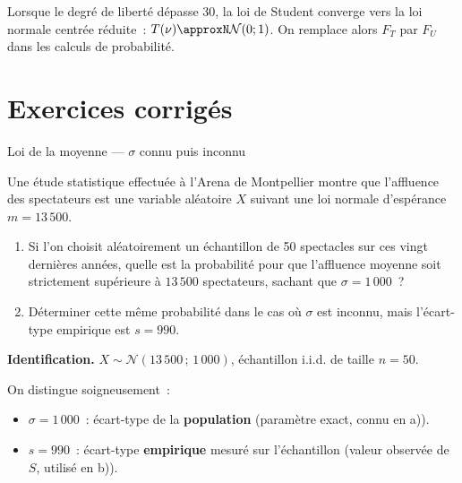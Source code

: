 \documentclass[11pt,a4paper]{article}
\newcommand{\N}{\mathcal{N}}
\newcommand{\corrsep}{\vspace{4pt}{\color{rulecol}\hrule height 0.6pt}\vspace{6pt}}
\begin{document}
\begin{methbox}
Lorsque le degr\'e de libert\'e d\'epasse 30, la loi de Student converge vers la loi normale centr\'ee r\'eduite~: $T(\nu) \approxN \N(0;1)$. On remplace alors $F_T$ par $F_U$ dans les calculs de probabilit\'e.
\end{methbox}

\newpage
\section{Exercices corrig\'es}

\begin{exercice}{Loi de la moyenne --- $\sigma$ connu puis inconnu}

Une \'etude statistique effectu\'ee \`a l'Arena de Montpellier montre que l'affluence des
spectateurs est une variable al\'eatoire $X$ suivant une loi normale d'esp\'erance $m=13\,500$.

\begin{enumerate}[label=\textbf{\alph*)}]
  \item Si l'on choisit al\'eatoirement un \'echantillon de 50 spectacles sur ces vingt derni\`eres
    ann\'ees, quelle est la probabilit\'e pour que l'affluence moyenne soit strictement
    sup\'erieure \`a $13\,500$ spectateurs, sachant que $\sigma = 1\,000$~?
  \item D\'eterminer cette m\^eme probabilit\'e dans le cas o\`u $\sigma$ est inconnu,
    mais l'\'ecart-type empirique est $s = 990$.
\end{enumerate}
\end{exercice}

\corrsep

\textbf{Identification.} $X \sim \N(13\,500\,;\,1\,000)$, \'echantillon i.i.d. de taille $n=50$.

On distingue soigneusement~:
\begin{itemize}
  \item $\sigma = 1\,000$~: \'ecart-type de la \textbf{population} (param\`etre exact, connu en a)).
  \item $s = 990$~: \'ecart-type \textbf{empirique} mesur\'e sur l'\'echantillon (valeur observ\'ee de~$S$, utilis\'e en b)).
\end{itemize}
\end{document}
